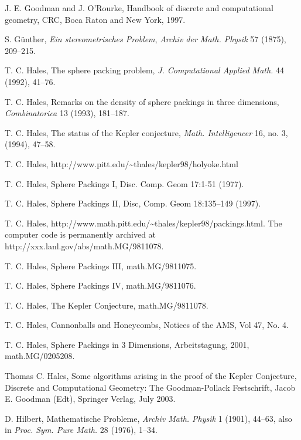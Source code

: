  J. E. Goodman and J. O'Rourke, Handbook of discrete and
    computational geometry, CRC, Boca Raton and New York, 1997.

 S. G\"unther, {\it Ein stereometrisches Problem},
{\it Archiv der Math. Physik} 57 (1875), 209--215.


 T. C. Hales, The sphere packing problem, {\it J. Computational
    Applied Math.} 44 (1992), 41--76.

 T. C. Hales, Remarks on the density of sphere packings in
    three dimensions, {\it Combinatorica} 13 (1993), 181--187.

 T. C. Hales, The status of the Kepler conjecture,
    {\it Math. Intelligencer} 16, no. 3, (1994), 47--58.

 T. C. Hales,
    {http://www.pitt.edu/\~\relax thales/kepler98/holyoke.html}

 T. C. Hales, Sphere Packings I, Disc. Comp. Geom 17:1-51
(1977).

 T. C. Hales, Sphere Packings II, Disc, Comp. Geom
18:135--149 (1997).

 T. C. Hales, \hfill{http://www.math.pitt.edu/\~%
    \relax thales/kepler98/packings.html}.  \hfill\break
    The computer code is
    permanently archived at\hfill\break
    http://xxx.lanl.gov/abs/math.MG/9811078.

 T. C. Hales, Sphere Packings III, math.MG/9811075.

 T. C. Hales, Sphere Packings IV, math.MG/9811076.

 T. C. Hales, The Kepler Conjecture, math.MG/9811078.

 T. C. Hales, Cannonballs and Honeycombs, Notices of the
AMS, Vol 47, No. 4.

 T. C. Hales, Sphere Packings in 3 Dimensions,
Arbeitstagung, 2001, math.MG/0205208.

 Thomas C. Hales, Some algorithms arising in the proof of
the Kepler Conjecture, Discrete and Computational Geometry: The
Goodman-Pollack Festschrift, Jacob E. Goodman (Edt), Springer
Verlag, July 2003.


 D. Hilbert, Mathematische Probleme, {\it Archiv Math. Physik} 1 (1901),
    44--63, also in {\it Proc. Sym. Pure Math.} 28 (1976), 1--34.

